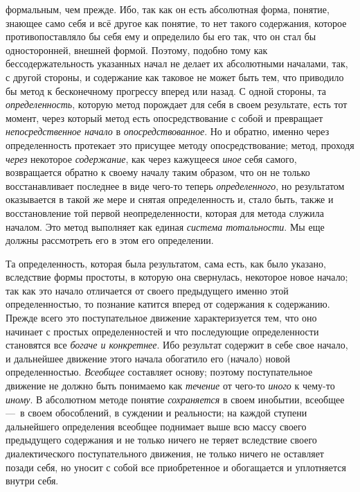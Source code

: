 \documentclass[twoside]{article}
\begin{document}
{{формальным, чем прежде. Ибо, так как он есть абсолютная форма, понятие,
знающее само себя и всё другое как понятие, то нет такого содержания,
которое противопоставляло бы себя ему и определило бы его так, что он стал
бы односторонней, внешней формой. Поэтому, подобно тому как
бессодержательность указанных начал не делает их абсолютными началами, так,
с другой стороны, и содержание как таковое не может быть
тем, что приводило бы метод к бесконечному прогрессу вперед или назад. С
одной стороны, та {\em определенность},
которую метод порождает для себя в своем результате, есть тот
момент, через который метод есть опосредствование с собой и превращает
{\em непосредственное начало} в {\em опосредствованное}.
Но и обратно, именно через определенность протекает это
присущее методу опосредствование; метод, проходя
{\em через} некоторое
{\em содержание}, как
через кажущееся {\em иное}
себя самого, возвращается обратно к своему началу таким
образом, что он не только восстанавливает последнее в виде чего-то теперь
{\em определенного}, но
результатом оказывается в такой же мере и снятая определенность и, стало
быть, также и восстановление той первой неопределенности, которая для
метода служила началом. Это метод выполняет как единая
{\em система тотальности}.
Мы еще должны рассмотреть его в этом его определении.

Та определенность, которая была результатом, сама есть, как
было указано, вследствие формы простоты, в которую она свернулась,
некоторое новое начало; так как это начало отличается от своего предыдущего
именно этой определенностью, то познание катится вперед от содержания к
содержанию. Прежде всего это поступательное движение характеризуется тем,
что оно начинает с простых определенностей и что последующие определенности
становятся все {\em богаче и
конкретнее}. Ибо результат содержит в себе свое начало, и
дальнейшее движение этого начала обогатило его (начало) новой
определенностью. {\em Всеобщее}
составляет основу; поэтому поступательное движение не должно
быть понимаемо как {\em течение}
от чего-то
{\em иного} к
чему-то {\em иному}.
В абсолютном методе понятие
{\em сохраняется} в своем
инобытии, всеобщее —~в своем обособлений, в суждении и
реальности; на каждой ступени дальнейшего определения всеобщее поднимает
выше всю массу своего предыдущего содержания и не только ничего не теряет
вследствие своего диалектического поступательного движения, не только
ничего не оставляет позади себя, но уносит с собой все приобретенное и
обогащается и уплотняется внутри себя.

}}
\end{document}
